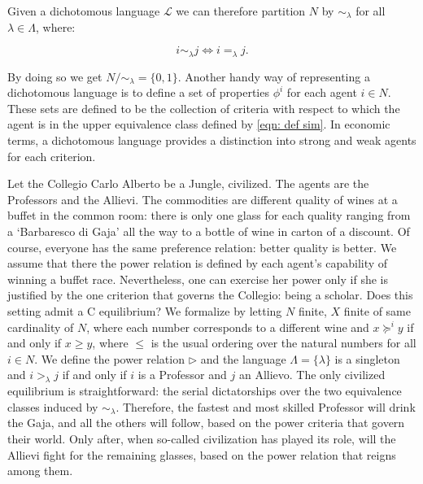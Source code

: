 Given a dichotomous language $\mathcal{L}$ we can therefore partition $N$ by $\sim_{\lambda}$ for all $\lambda\in\Lambda$, where:

\begin{equation}\label{eqn: def sim}
    i\sim_{\lambda} j \Leftrightarrow i=_{\lambda}j.
\end{equation}

By doing so we get $N/\sim_{\lambda}=\{0,1\}$. Another handy way of representing a dichotomous language is to define a set of properties $\phi^i$ for each agent $i\in N$. These sets are defined to be the collection of criteria with respect to which the agent is in the upper equivalence class defined by \cref{eqn: def sim}. In economic terms, a dichotomous language provides a distinction into strong and weak agents for each criterion. 


\begin{example}\label{Example: CCA}
    Let the Collegio Carlo Alberto be a Jungle, civilized. The agents are the Professors and the Allievi. The commodities are different quality of wines at a buffet in the common room: there is only one glass for each quality ranging from a `Barbaresco di Gaja' all the way to a bottle of wine in carton of a discount. Of course, everyone has the same preference relation: better quality is better. We assume that there the power relation is defined by each agent's capability of winning a buffet race. Nevertheless, one can exercise her power only if she is justified by the one criterion that governs the Collegio: being a scholar. Does this setting admit a C equilibrium? We formalize by letting $N$ finite, $X$ finite of same cardinality of $N$, where each number corresponds to a different wine and $x\succeq^i y$ if and only if $x\geq y$, where $\leq$ is the usual ordering over the natural numbers for all $i\in N$. We define the power relation $\triangleright$ and the language $\Lambda=\{\lambda\}$ is a singleton and $i>_{\lambda}j$ if and only if $i$ is a Professor and $j$ an Allievo. The only civilized equilibrium is straightforward: the serial dictatorships over the two equivalence classes induced by $\sim_{\lambda}$. Therefore, the fastest and most skilled Professor will drink the Gaja, and all the others will follow, based on the power criteria that govern their world. Only after, when so-called civilization has played its role, will the Allievi fight for the remaining glasses, based on the power relation that reigns among them. 

\end{example}

